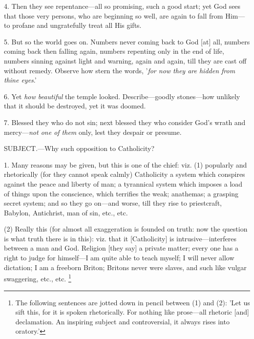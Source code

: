 4. Then they see repentance—all so promising,
such a good start; yet God sees that those very persons, who are
beginning so well, are again to fall from Him—to profane and
ungratefully treat all His gifts.

5. But so the world goes on. Numbers never coming
back to God [at] all, numbers coming back then falling again, numbers
repenting only in the end of life, numbers sinning against light and
warning, again and again, till they are cast off without remedy.
Observe how stern the words, '\emph{for now they are hidden from thine
eyes}.'

6. Yet \emph{how beautiful} the temple looked.
Describe—goodly stones—how unlikely that it should be destroyed,
yet it was doomed.

7. Blessed they who do not sin; next blessed they
who consider God's wrath and mercy—\emph{not one of them} only, lest
they despair or presume.


SUBJECT.—Why
such opposition to Catholicity?

1. Many reasons may be given, but this is one of
the chief: viz. (1) popularly and rhetorically (for they cannot
speak calmly) Catholicity a system which conspires against the peace
and liberty of man; a tyrannical system which imposes a load of things
upon the conscience, which terrifies the weak; anathemas; a grasping
secret system; and so they go on—and worse, till they rise to
priestcraft, Babylon, Antichrist, man of sin, etc., etc.

(2) Really this (for almost all exaggeration is
founded on truth: now the question is what truth there is in this):
viz. that it [Catholicity] is intrusive—interferes between a man and
God. Religion [they say] a private matter; every one has a right to
judge for himself—I am quite able to teach myself; I will never
allow dictation; I am a freeborn Briton; Britons never were slaves,
and such like vulgar swaggering, etc., etc. \footnote{The following sentences
are jotted down in pencil between (1) and (2): 'Let us sift this, for
it is spoken rhetorically. For nothing like prose—all rhetoric [and]
declamation. An inspiring subject and controversial, it always rises
into oratory.'}


